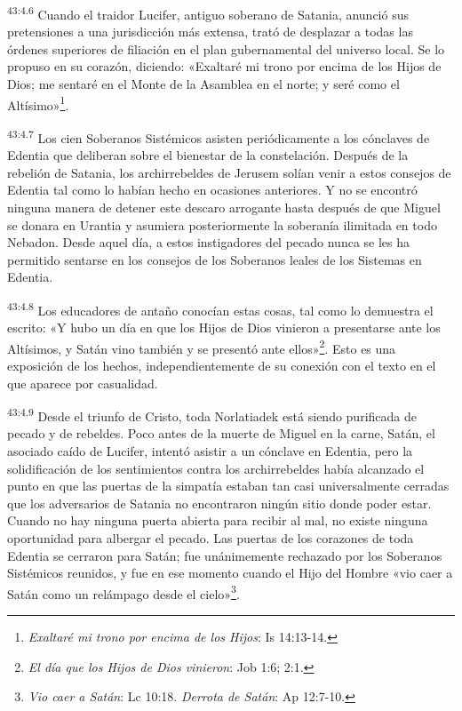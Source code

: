 \par
\textsuperscript{43:4.6} Cuando el traidor Lucifer, antiguo soberano de Satania, anunció sus pretensiones a una jurisdicción más extensa, trató de desplazar a todas las órdenes superiores de filiación en el plan gubernamental del universo local. Se lo propuso en su corazón, diciendo: «Exaltaré mi trono por encima de los Hijos de Dios; me sentaré en el Monte de la Asamblea en el norte; y seré como el Altísimo»\footnote{\textit{Exaltaré mi trono por encima de los Hijos}: Is 14:13-14.}.

\par
\textsuperscript{43:4.7} Los cien Soberanos Sistémicos asisten periódicamente a los cónclaves de Edentia que deliberan sobre el bienestar de la constelación. Después de la rebelión de Satania, los archirrebeldes de Jerusem solían venir a estos consejos de Edentia tal como lo habían hecho en ocasiones anteriores. Y no se encontró ninguna manera de detener este descaro arrogante hasta después de que Miguel se donara en Urantia y asumiera posteriormente la soberanía ilimitada en todo Nebadon. Desde aquel día, a estos instigadores del pecado nunca se les ha permitido sentarse en los consejos de los Soberanos leales de los Sistemas en Edentia.

\par
\textsuperscript{43:4.8} Los educadores de antaño conocían estas cosas, tal como lo demuestra el escrito: «Y hubo un día en que los Hijos de Dios vinieron a presentarse ante los Altísimos, y Satán vino también y se presentó ante ellos»\footnote{\textit{El día que los Hijos de Dios vinieron}: Job 1:6; 2:1.}. Esto es una exposición de los hechos, independientemente de su conexión con el texto en el que aparece por casualidad.

\par
\textsuperscript{43:4.9} Desde el triunfo de Cristo, toda Norlatiadek está siendo purificada de pecado y de rebeldes. Poco antes de la muerte de Miguel en la carne, Satán, el asociado caído de Lucifer, intentó asistir a un cónclave en Edentia, pero la solidificación de los sentimientos contra los archirrebeldes había alcanzado el punto en que las puertas de la simpatía estaban tan casi universalmente cerradas que los adversarios de Satania no encontraron ningún sitio donde poder estar. Cuando no hay ninguna puerta abierta para recibir al mal, no existe ninguna oportunidad para albergar el pecado. Las puertas de los corazones de toda Edentia se cerraron para Satán; fue unánimemente rechazado por los Soberanos Sistémicos reunidos, y fue en ese momento cuando el Hijo del Hombre «vio caer a Satán como un relámpago desde el cielo»\footnote{\textit{Vio caer a Satán}: Lc 10:18. \textit{Derrota de Satán}: Ap 12:7-10.}.

